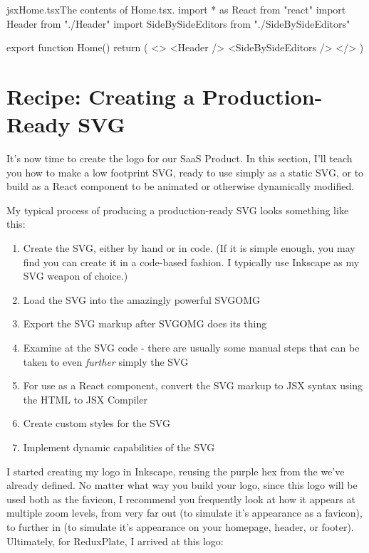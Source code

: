 \documentclass[a4paper,headinclude=on,footinclude=on,12pt,oneside]{scrbook}
\begin{document}
\begin{codeInput}{jsx}{Home.tsx}{The contents of Home.tsx.}
import * as React from "react"
import { Header } from "./Header"
import { SideBySideEditors } from "./SideBySideEditors"

export function Home() {
  return (
    <>
      <Header />
      <SideBySideEditors />
    </>
  )
}  
\end{codeInput}

\section{Recipe: Creating a Production-Ready SVG}

It's now time to create the logo for our SaaS Product. In this section, I'll teach you how to make a low footprint SVG, ready to use simply as a static SVG, or to build as a React component to be animated or otherwise dynamically modified.

My typical process of producing a production-ready SVG looks something like this:

\begin{enumerate}
\item Create the SVG, either by hand or in code. (If it is simple enough, you may find you can create it in a code-based fashion. I typically use Inkscape as my SVG weapon of choice.)
\item Load the SVG into the amazingly powerful SVGOMG
\item Export the SVG markup after SVGOMG does its thing
\item Examine at the SVG code - there are usually some manual steps that can be taken to even \textit{further} simply the SVG
\item For use as a React component, convert the SVG markup to JSX syntax using the HTML to JSX Compiler
\item Create custom styles for the SVG
\item Implement dynamic capabilities of the SVG
\end{enumerate}


I started creating my logo in Inkscape, reusing the purple hex from the  we've already defined. No matter what way you build your logo, since this logo will be used both as the favicon, I recommend you frequently look at how it appears at multiple zoom levels, from very far out (to simulate it's appearance as a favicon), to further in (to simulate it's appearance on your homepage, header, or footer). Ultimately, for ReduxPlate, I arrived at this logo:
\end{document}
